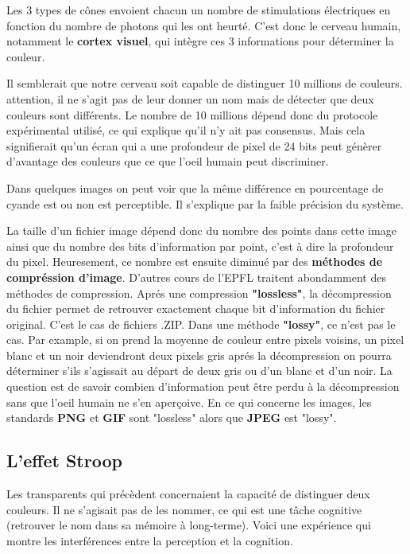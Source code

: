 Les 3 types de c\^ones envoient chacun un nombre de stimulations \'electriques en fonction du nombre de photons qui les ont heurt\'e. C'est donc le cerveau humain, notamment le \textbf{cortex visuel}, qui int\`egre ces 3 informations pour d\'eterminer la couleur. 

Il semblerait que notre cerveau soit capable de distinguer 10 millions de couleurs. attention, il ne s'agit pas de leur donner un nom mais de d\'etecter que deux couleurs sont diff\'erents. Le nombre de 10 millions d\'epend donc du protocole exp\'erimental utilis\'e, ce qui explique qu'il n'y ait pas consensus. Mais cela signifierait qu'un \'ecran qui a une profondeur de pixel de 24 bits peut g\'en\`erer d'avantage des couleurs que ce que l'oeil humain peut discriminer. 

Dans quelques images on peut voir que la m\^eme diff\'erence en pourcentage de cyande est ou non est perceptible. Il s'explique par la faible pr\'ecision du syst\`eme.

La taille d'un fichier image d\'epend donc du nombre des points dans cette image ainsi que du nombre des bits d'information par point, c'est à dire la profondeur du pixel. Heuresement, ce nombre est ensuite diminu\'e par des \textbf{m\'ethodes de compr\'ession d'image}. D'autres cours de l'EPFL traitent abondamment des m\'ethodes de compression. Apr\'es une compression \textbf{"lossless"}, la d\'ecompression du fichier permet de retrouver exactement chaque bit d'information du fichier original. C'est le cas de fichiers .ZIP. Dans une m\'ethode \textbf{"lossy"}, ce n'est pas le cas. Par example, si on prend la moyenne de couleur entre pixels voisins, un pixel blanc et un noir deviendront deux pixels gris apr\'es la d\'ecompression on pourra d\'eterminer s'ils s'agissait au d\'epart de deux gris ou d'un blanc et d'un noir. La question est de savoir combien d'information peut \^etre perdu \`a la d\'ecompression sans que l'oeil humain ne s'en aper\c{c}oive. En ce qui concerne les images, les standards \textbf{PNG} et \textbf{GIF} sont "lossless" alors que \textbf{JPEG} est "lossy".

\subsection{L'effet Stroop}

Les transparents qui pr\'ec\`edent concernaient la capacit\'e de distinguer deux couleurs. Il ne s'agisait pas de les nommer, ce qui est une t\^ache cognitive (retrouver le nom dans sa m\'emoire \`a long-terme). Voici une exp\'erience qui montre les interf\'erences entre la perception et la cognition. 

